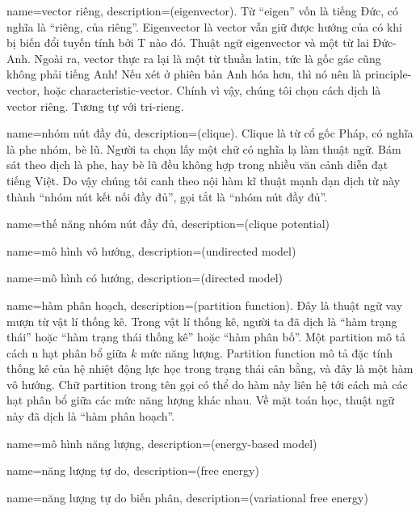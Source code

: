 {
    name={vector riêng},
    description={(eigenvector). Từ ``eigen'' vốn là tiếng Đức,
    có nghĩa là ``riêng, của riêng''. Eigenvector là vector
    vẫn giữ được hướng của có khi bị biến đổi tuyến tính bởi T
    nào đó. Thuật ngữ eigenvector và một từ lai Đức-Anh. Ngoài ra,
    vector thực ra lại là một từ thuần latin, tức là gốc gác
    cũng không phải tiếng Anh! Nếu xét ở phiên bản Anh hóa hơn,
    thì nó nên là principle-vector, hoặc characteristic-vector.
    Chính vì vậy, chúng tôi chọn cách dịch là vector riêng.
    Tương tự với \gls{tri-rieng}.}
}

{
    name={nhóm nút đầy đủ},
    description={(clique). Clique là từ cổ gốc Pháp, có nghĩa là phe nhóm,
    bè lũ. Người ta chọn lấy một chữ có nghĩa lạ làm thuật ngữ.
    Bám sát theo dịch là phe, hay bè lũ đều không hợp trong nhiều
    văn cảnh diễn đạt tiếng Việt. Do vậy chúng tôi canh
    theo nội hàm kĩ thuật mạnh dạn dịch từ này thành
    ``nhóm nút kết nối đầy đủ'', gọi tắt là ``nhóm nút đầy đủ''.}
}

{
    name={thế năng nhóm nút đầy đủ},
    description={(clique potential)}
}

{
    name={mô hình vô hướng},
    description={(undirected model)}
}

{
    name={mô hình có hướng},
    description={(directed model)}
}

{
    name={hàm phân hoạch},
    description={(partition function). Đây là thuật ngữ vay mượn
    từ vật lí thống kê. Trong vật lí thống kê, người ta đã dịch là
    ``hàm trạng thái'' hoặc ``hàm trạng thái thống kê'' hoặc
    ``hàm phân bố''. Một partition mô tả cách n hạt phân bổ giữa
    $k$ mức năng lượng. Partition function mô tả đặc tính thống kê
    của hệ nhiệt động lực học trong trạng thái cân bằng, và đây là
    một hàm vô hướng. Chữ partition trong tên gọi có thể do
    hàm này liên hệ tới cách mà các hạt phân bổ giữa các mức năng
    lượng khác nhau. Về mặt toán học, thuật ngữ này đã dịch là
    ``hàm phân hoạch''.}
}

{
    name={mô hình năng lượng},
    description={(energy-based model)}
}

{
    name={năng lượng tự do},
    description={(free energy)}
}

{
    name={năng lượng tự do biến phân},
    description={(variational free energy)}
}

